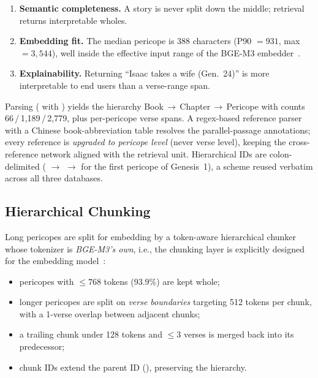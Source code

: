\begin{enumerate}
\item \textbf{Semantic completeness.} A story is never split down the
middle; retrieval returns interpretable wholes.
\item \textbf{Embedding fit.} The median pericope is 388 characters
(P90 $=931$, max $=3{,}544$), well inside the effective input range of the
BGE-M3 embedder~\cite{chen2024bgem3}.
\item \textbf{Explainability.} Returning ``Isaac takes a wife
(Gen.~24)'' is more interpretable to end users than a verse-range span.
\end{enumerate}

Parsing ( with ) yields
the hierarchy Book\,$\rightarrow$\,Chapter\,$\rightarrow$\,Pericope with
counts 66\,/\,1{,}189\,/\,2{,}779, plus per-pericope verse spans. A
regex-based reference parser with a Chinese book-abbreviation table
resolves the parallel-passage annotations; every reference is
\emph{upgraded to pericope level} (never verse level), keeping the
cross-reference network aligned with the retrieval unit. Hierarchical IDs
are colon-delimited ( $\rightarrow$  $\rightarrow$
 for the first pericope of Genesis~1), a scheme reused
verbatim across all three databases.

\subsection{Hierarchical Chunking}
\label{sec:chunking}

Long pericopes are split for embedding by a token-aware hierarchical
chunker whose tokenizer is \emph{BGE-M3's own}, i.e., the chunking layer
is explicitly designed for the embedding model~\cite{chen2024bgem3}:

\begin{itemize}
\item pericopes with $\le 768$ tokens (93.9\%) are kept whole;
\item longer pericopes are split on \emph{verse boundaries} targeting 512
tokens per chunk, with a 1-verse overlap between adjacent chunks;
\item a trailing chunk under 128 tokens and $\le 3$ verses is merged back
into its predecessor;
\item chunk IDs extend the parent ID (), preserving the
hierarchy.
\end{itemize}

